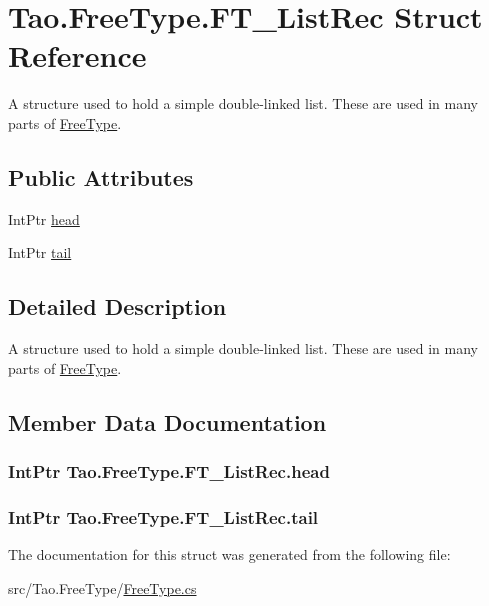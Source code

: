 \hypertarget{struct_tao_1_1_free_type_1_1_f_t___list_rec}{
\section{Tao.FreeType.FT\_\-ListRec Struct Reference}
\label{struct_tao_1_1_free_type_1_1_f_t___list_rec}
}


A structure used to hold a simple double-\/linked list. These are used in many parts of \hyperlink{namespace_tao_1_1_free_type}{FreeType}.  


\subsection*{Public Attributes}
\begin{DoxyCompactItemize}
\item 
IntPtr \hyperlink{struct_tao_1_1_free_type_1_1_f_t___list_rec_a82ee3a0350cb0f33f4166046a4a2eacc}{head}
\item 
IntPtr \hyperlink{struct_tao_1_1_free_type_1_1_f_t___list_rec_a3aeacb0b0c2fc5c8b59d9a708d516c72}{tail}
\end{DoxyCompactItemize}


\subsection{Detailed Description}
A structure used to hold a simple double-\/linked list. These are used in many parts of \hyperlink{namespace_tao_1_1_free_type}{FreeType}. 

\subsection{Member Data Documentation}
\hypertarget{struct_tao_1_1_free_type_1_1_f_t___list_rec_a82ee3a0350cb0f33f4166046a4a2eacc}{
\subsubsection[{head}]{\setlength{\rightskip}{0pt plus 5cm}IntPtr {\bf Tao.FreeType.FT\_\-ListRec.head}}}
\label{struct_tao_1_1_free_type_1_1_f_t___list_rec_a82ee3a0350cb0f33f4166046a4a2eacc}
\hypertarget{struct_tao_1_1_free_type_1_1_f_t___list_rec_a3aeacb0b0c2fc5c8b59d9a708d516c72}{
\subsubsection[{tail}]{\setlength{\rightskip}{0pt plus 5cm}IntPtr {\bf Tao.FreeType.FT\_\-ListRec.tail}}}
\label{struct_tao_1_1_free_type_1_1_f_t___list_rec_a3aeacb0b0c2fc5c8b59d9a708d516c72}


The documentation for this struct was generated from the following file:\begin{DoxyCompactItemize}
\item 
src/Tao.FreeType/\hyperlink{_free_type_8cs}{FreeType.cs}\end{DoxyCompactItemize}
